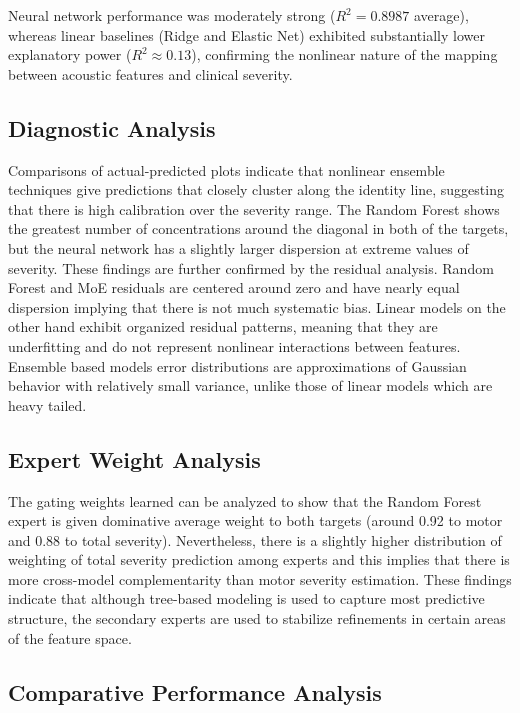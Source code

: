 \documentclass{customIEEEsingle}
\begin{document}
	Neural network performance was moderately strong ($R^2 = 0.8987$ average), whereas linear baselines (Ridge and Elastic Net) exhibited substantially lower explanatory power ($R^2 \approx 0.13$), confirming the nonlinear nature of the mapping between acoustic features and clinical severity.
	
	\subsection{Diagnostic Analysis}
	
	Comparisons of actual-predicted plots indicate that nonlinear ensemble techniques give predictions that closely cluster along the identity line, suggesting that there is high calibration over the severity range. The Random Forest shows the greatest number of concentrations around the diagonal in both of the targets, but the neural network has a slightly larger dispersion at extreme values of severity. These findings are further confirmed by the residual analysis. Random Forest and MoE residuals are centered around zero and have nearly equal dispersion implying that there is not much systematic bias. Linear models on the other hand exhibit organized residual patterns, meaning that they are underfitting and do not represent nonlinear interactions between features. 	Ensemble based models error distributions are approximations of Gaussian behavior with relatively small variance, unlike those of linear models which are heavy tailed.
	
	\subsection{Expert Weight Analysis}
	
	The gating weights learned can be analyzed to show that the Random Forest expert is given dominative average weight to both targets (around 0.92 to motor and 0.88 to total severity). Nevertheless, there is a slightly higher distribution of weighting of total severity prediction among experts and this implies that there is more cross-model complementarity than motor severity estimation. These findings indicate that although tree-based modeling is used to capture most predictive structure, the secondary experts are used to stabilize refinements in certain areas of the feature space.
	
\subsection{Comparative Performance Analysis}
\end{document}
